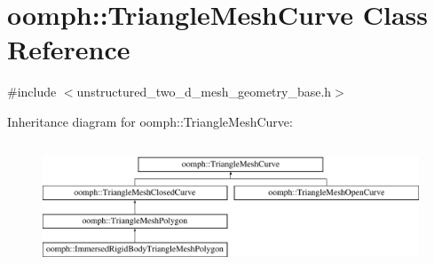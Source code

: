 \hypertarget{classoomph_1_1TriangleMeshCurve}{}\section{oomph\+:\+:Triangle\+Mesh\+Curve Class Reference}
\label{classoomph_1_1TriangleMeshCurve}


{\ttfamily \#include $<$unstructured\+\_\+two\+\_\+d\+\_\+mesh\+\_\+geometry\+\_\+base.\+h$>$}

Inheritance diagram for oomph\+:\+:Triangle\+Mesh\+Curve\+:\begin{figure}[H]
\begin{center}
\leavevmode
\includegraphics[height=3.783784cm]{classoomph_1_1TriangleMeshCurve}
\end{center}
\end{figure}
